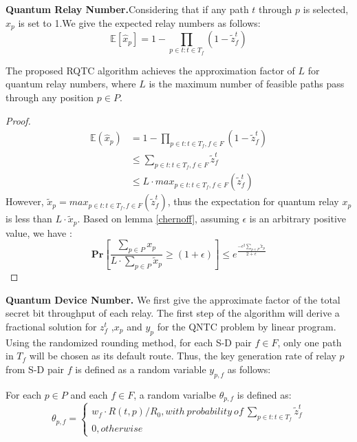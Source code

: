 \textbf{Quantum Relay Number.}Considering that if any path $t$ through $p$ is selected, $\hat{x}_p$ is set to 1.We give the expected relay numbers as follows:
\begin{equation}
\mathbb{E}[\hat{x}_p] = 1 - \prod_{p \in t: t \in T_f}{(1-\widetilde{z}_f^t)}
\end{equation}
\begin{theorem}
  The proposed RQTC algorithm achieves the approximation factor of $L$ for quantum relay numbers, where $L$ is the maximum number of feasible paths pass through any position $p \in P$.
  \begin{proof}
  \begin{equation}
  \begin{aligned}
    \mathbb{E}(\hat{x}_p) &= 1 - \prod_{p \in t: t \in T_f,f \in F}{(1-\widetilde{z}_f^t)} \\
    &\le \sum_{p \in t: t \in T_f,f \in F}\widetilde{z}_f^t \\
    &\le L \cdot max_{p \in t: t \in T_f,f \in F}(\widetilde{z}_f^t)
    \end{aligned}
  \end{equation}
  However, $\widetilde{x}_p = max_{p \in t: t \in T_f,f \in F}(\widetilde{z}_f^t)$, thus the expectation for quantum relay $x_p$ is less than $L \cdot \widetilde{x}_p$. Based on lemma \ref{chernoff},  assuming $\epsilon$ is an arbitrary positive value, we have :
  \begin{equation}\label{pr1}
    \textbf{Pr}[\frac{\sum_{p \in P}x_p}{L \cdot \sum_{p \in P}\widetilde{x}_p} \ge (1+\epsilon)] \le e^{\frac{-\epsilon^2\sum_{p \in P}\widetilde{x}_p}{2+\epsilon}}
  \end{equation}
  \end{proof}
\end{theorem}


\textbf{Quantum Device Number.} We first give the approximate factor of the total secret bit throughput of each relay. The first step of the algorithm will derive a fractional solution for $z_f^t$ ,$x_p$ and $y_p$ for the QNTC problem by linear program. Using the randomized rounding method, for each S-D pair $f \in F$, only one path in $T_f$ will be chosen as its default route. Thus, the key generation rate of relay $p$ from S-D pair $f$ is defined as a random variable $y_{p,f}$ as follows:
\begin{definition}\label{def1}
For each $p \in P$ and each $f \in F$, a random varialbe $\theta_{p,f}$ is defined as:
\begin{equation}\label{ypf}
\theta_{p,f}=
\begin{cases}
   w_f \cdot R(t,p)/R_0, with \ probability \ of \ \sum_{p \in t:t \in T_f}\widetilde{z}_f^t \\
   0, otherwise
\end{cases}
\end{equation}

\end{definition}

